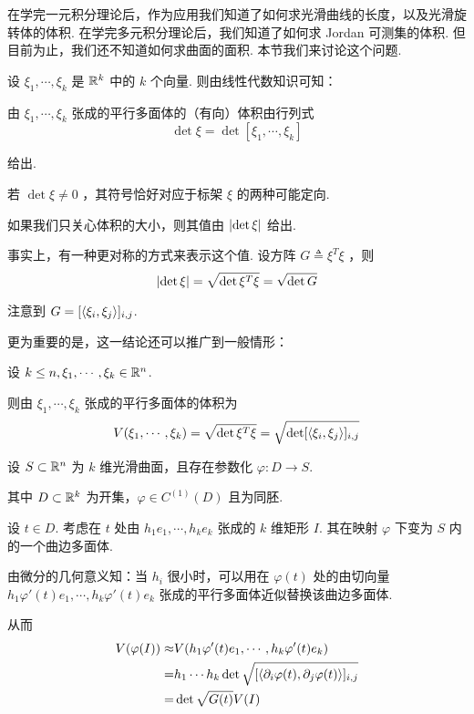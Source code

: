 在学完一元积分理论后，作为应用我们知道了如何求光滑曲线的长度，以及光滑旋转体的体积.
在学完多元积分理论后，我们知道了如何求 Jordan 可测集的体积.
但目前为止，我们还不知道如何求曲面的面积. 本节我们来讨论这个问题.


设 $\xi_1,\cdots,\xi_k$ 是 $\mathbb{R}^k$ 中的 $k$ 个向量. 则由线性代数知识可知：

由 $\xi_1,\cdots,\xi_k$ 张成的平行多面体的（有向）体积由行列式
$$
\det\xi=\det[\xi_1,\cdots,\xi_k]
$$

给出.

若 $\det\xi\ne 0$ ，其符号恰好对应于标架 $\xi$ 的两种可能定向.

如果我们只关心体积的大小，则其值由 $\lvert{\det\xi}\rvert$ 给出.

事实上，有一种更对称的方式来表示这个值. 设方阵 $G\triangleq\xi^T\xi$ ，则
$$
\lvert{\det\xi}\rvert=\sqrt{\det\xi^T\xi}=\sqrt{\det G}
$$

注意到 $G=[\left\langle{\xi_i,\xi_j}\right\rangle]_{i,j}$.

更为重要的是，这一结论还可以推广到一般情形：

\begin{property}
    设 $k\le n,\xi_1,\cdots,\xi_k\in\mathbb{R}^n$.

    则由 $\xi_1,\cdots,\xi_k$ 张成的平行多面体的体积为
$$
V(\xi_1,\cdots,\xi_k)=\sqrt{\det\xi^T\xi}=\sqrt{\det[\left\langle{\xi_i,\xi_j}\right\rangle]_{i,j}}
$$
\end{property}


设 $S\subset\mathbb{R}^n$ 为 $k$ 维光滑曲面，且存在参数化 $\varphi:D\to S$.

其中 $D\subset\mathbb{R}^k$ 为开集，$\varphi\in C^{(1)}(D)$ 且为同胚.


设 $t\in D$. 考虑在 $t$ 处由 $h_1e_1,\cdots,h_ke_k$ 张成的 $k$ 维矩形 $I$. 其在映射 $\varphi$ 下变为 $S$ 内的一个曲边多面体.

由微分的几何意义知：当 $h_i$ 很小时，可以用在 $\varphi(t)$ 处的由切向量 $h_1\varphi'(t)e_1,\cdots,h_k\varphi'(t)e_k$ 张成的平行多面体近似替换该曲边多面体.

从而
$$
\begin{aligned}
    V(\varphi(I))\approx &V(h_1\varphi'(t)e_1,\cdots,h_k\varphi'(t)e_k)\\
    =&h_1\cdots h_k\det\sqrt{[\left\langle{\partial_i\varphi(t),\partial_j\varphi(t)}\right\rangle]_{i,j}}\\
    =&\det\sqrt{G(t)}V(I)
\end{aligned}
$$

